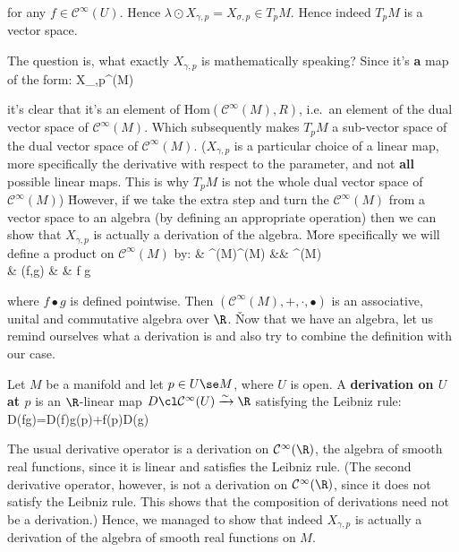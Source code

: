 for any $f\in \mathcal{C}^\infty(U)$. Hence $\lambda \odot X_{\gamma,p}=X_{\sigma,p}\in T_p M$. Hence indeed $T_p M$ is a vector space. \qedhere
\een
\eq

The question is, what exactly $X_{\gamma,p}$ is mathematically speaking? Since it's \textbf{a} map of the form:
X_{\gamma,p}\cl {}^\infty(M) \xrightarrow{\sim} \R
\ei

it's clear that it's an element of $\mathrm{Hom}(\mathcal{C}^\infty(M),R)$, i.e.\ an element of the dual vector space
of $\mathcal{C}^\infty(M)$. Which subsequently makes $T_p M$ a sub-vector space of the dual vector space of
$\mathcal{C}^\infty(M)$. ($X_{\gamma,p}$ is a particular choice of a linear map, more specifically the derivative
with respect to the parameter, and not \textbf{all} possible linear maps. This is why $T_p M$ is not the whole dual
vector space of $\mathcal{C}^\infty(M)$) \v

However, if we take the extra step and turn the $\mathcal{C}^\infty(M)$ from a vector space to an algebra (by
defining an appropriate operation) then we can show that $X_{\gamma,p}$ is actually a derivation of the algebra. \v

More specifically we will define a product on $\mathcal{C}^\infty(M)$ by:
\bullet \cl & ^\infty(M)\times {}^\infty(M) &\to& ^\infty(M)\\
& (f,g) & \mapsto & f \bullet g
\ei

where $f \bullet g$ is defined pointwise. Then $(\mathcal{C}^\infty(M),+,\cdot,\bullet)$ is an associative, unital
and commutative algebra over $\R$. \v

Now that we have an algebra, let us remind ourselves what a derivation is and also try to combine the definition with
our case.

Let $M$ be a manifold and let $p\in U \se M$, where $U$ is open. A \textbf{derivation on $U$ at $p$} is an $\R$-linear
map $D\cl \mathcal{C}^\infty(U)\xrightarrow{\sim}\R$ satisfying the Leibniz rule:
\bse
D(fg)=D(f)g(p)+f(p)D(g)
\ese
\ed

The usual derivative operator is a derivation on $\mathcal{C}^\infty(\R)$, the algebra of smooth real functions,
since it is linear and satisfies the Leibniz rule. (The second derivative operator, however, is not a derivation on
$\mathcal{C}^\infty(\R)$, since it does not satisfy the Leibniz rule. This shows that the composition of derivations
need not be a derivation.) Hence, we managed to show that indeed $X_{\gamma,p}$ is actually a derivation of the
algebra of smooth real functions on $M$.

